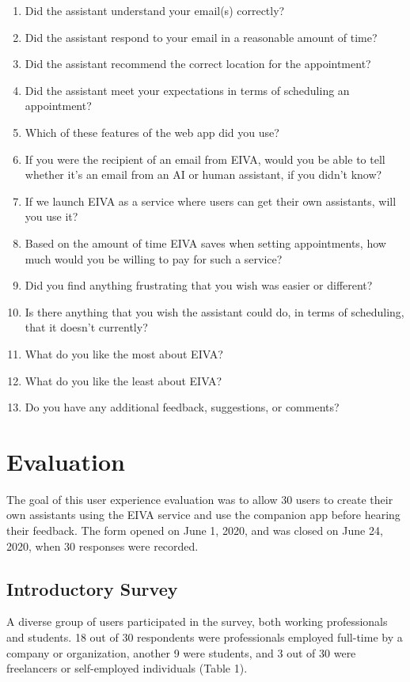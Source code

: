 \documentclass{article}
\begin{document}
\begin{enumerate}
	\item Did the assistant understand your email(s) correctly?
	\item Did the assistant respond to your email in a reasonable amount of time?
	\item Did the assistant recommend the correct location for the appointment?
	\item Did the assistant meet your expectations in terms of scheduling an appointment?
	\item Which of these features of the web app did you use?
	\item If you were the recipient of an email from EIVA, would you be able to tell whether it's an email from an AI or human assistant, if you didn't know?
	\item If we launch EIVA as a service where users can get their own assistants, will you use it?
	\item Based on the amount of time EIVA saves when setting appointments, how much would you be willing to pay for such a service?
	\item Did you find anything frustrating that you wish was easier or different?
	\item Is there anything that you wish the assistant could do, in terms of scheduling, that it doesn't currently?
	\item What do you like the most about EIVA?
	\item What do you like the least about EIVA?
	\item Do you have any additional feedback, suggestions, or comments?
\end{enumerate}

\newpage

\section{Evaluation}

The goal of this user experience evaluation was to allow 30 users to create their own assistants using the EIVA service and use the companion app before hearing their feedback. The form opened on June 1, 2020, and was closed on June 24, 2020, when 30 responses were recorded.

\subsection{Introductory Survey}

A diverse group of users participated in the survey, both working professionals and students. 18 out of 30 respondents were professionals employed full-time by a company or organization, another 9 were students, and 3 out of 30 were freelancers or self-employed individuals (Table 1).
\end{document}
